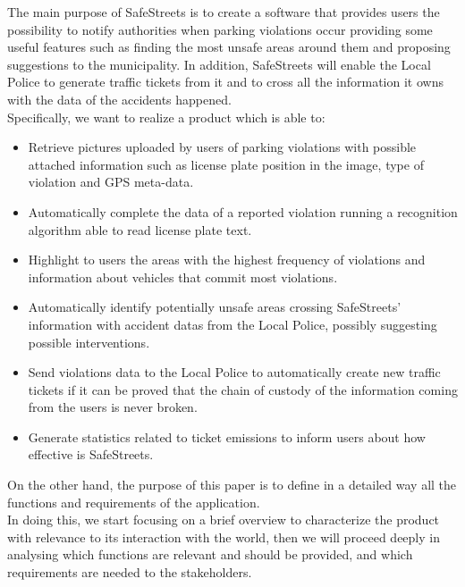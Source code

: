 The main purpose of SafeStreets is to create a software that provides users the possibility to notify	
authorities	when parking violations occur providing some useful features such as finding the most unsafe areas around them and proposing suggestions to the municipality. In addition, SafeStreets will enable the Local Police to generate traffic tickets from it and to cross all the information it owns with the data of the accidents happened.\\
Specifically, we want to realize a product which is able to:
\begin{itemize}
	
	\item Retrieve pictures uploaded by users of parking violations with possible attached information such as license plate position in the image, type of violation and GPS meta-data.
	
	\item Automatically complete the data of a reported violation running a recognition algorithm able to read license plate text.
	
	\item Highlight to users the areas with the highest frequency of violations and information about vehicles that commit most violations.
	
	\item Automatically identify	potentially unsafe	areas crossing SafeStreets' information with accident datas from the Local Police, possibly	suggesting	possible	interventions.
	
	\item Send violations data to the Local Police to automatically create new traffic tickets if it can be proved that the	chain	of	custody	of	the	information	coming	from	the	users	is	never	broken.
	
	\item Generate statistics related to ticket emissions to inform users about how effective is SafeStreets.
	
\end{itemize}

On the other hand, the purpose of this paper is to define in a detailed way all the functions and requirements of the application.\\ In doing this, we start focusing on a brief overview to characterize the product with relevance to its interaction with the world, then we will proceed deeply in analysing which functions are relevant and should be provided, and which requirements are needed to the stakeholders. 
